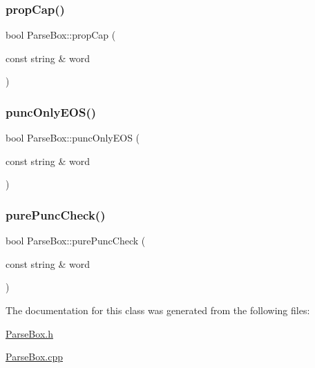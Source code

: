 \subsubsection{\texorpdfstring{prop\+Cap()}{propCap()}}
{\footnotesize\ttfamily bool Parse\+Box\+::prop\+Cap (\begin{DoxyParamCaption}\item[{const string \&}]{word }\end{DoxyParamCaption})}

\mbox{\label{class_parse_box_a1c28b6d19cabff28f54260d0b717062e}} 
\subsubsection{\texorpdfstring{punc\+Only\+E\+O\+S()}{puncOnlyEOS()}}
{\footnotesize\ttfamily bool Parse\+Box\+::punc\+Only\+E\+OS (\begin{DoxyParamCaption}\item[{const string \&}]{word }\end{DoxyParamCaption})}

\mbox{\label{class_parse_box_a8a507946e3db9f0d95baca471e6e7188}} 
\subsubsection{\texorpdfstring{pure\+Punc\+Check()}{purePuncCheck()}}
{\footnotesize\ttfamily bool Parse\+Box\+::pure\+Punc\+Check (\begin{DoxyParamCaption}\item[{const string \&}]{word }\end{DoxyParamCaption})}



The documentation for this class was generated from the following files\+:\begin{DoxyCompactItemize}
\item 
\hyperlink{_parse_box_8h}{Parse\+Box.\+h}\item 
\hyperlink{_parse_box_8cpp}{Parse\+Box.\+cpp}\end{DoxyCompactItemize}
